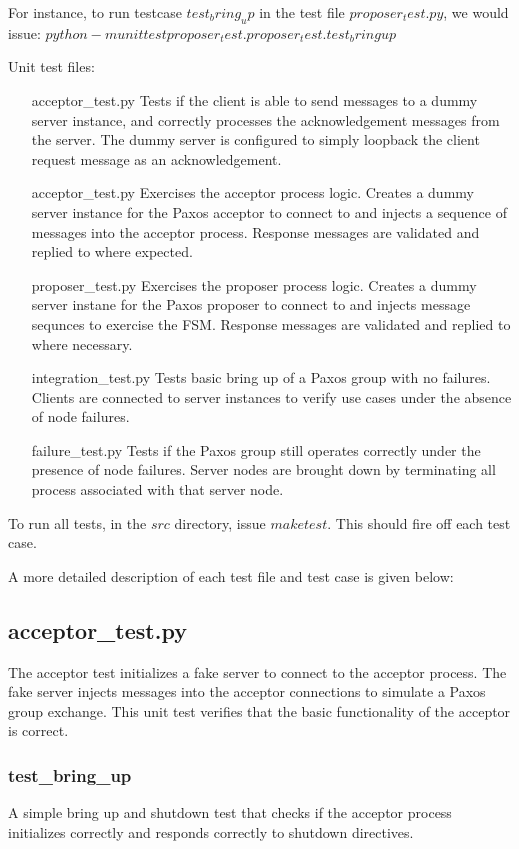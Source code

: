 \documentclass{article}
\begin{document}
For instance, to run testcase $test_bring_up$ in the test file $proposer_test.py$, we would issue:
$ python -m unittest proposer_test.proposer_test.test_bringup $

Unit test files:
\begin{itemize}
\item [acceptor\_test.py] Tests if the client is able to send messages to a dummy server instance, and correctly processes the acknowledgement messages from the server. 
  The dummy server is configured to simply loopback the client request message as an acknowledgement.
\item [acceptor\_test.py] Exercises the acceptor process logic. 
  Creates a dummy server instance for the Paxos acceptor to connect to and injects a sequence of messages into the acceptor process. 
  Response messages are validated and replied to where expected.
\item [proposer\_test.py] Exercises the proposer process logic.
  Creates a dummy server instane for the Paxos proposer to connect to and injects message sequnces to exercise the FSM.
  Response messages are validated and replied to where necessary.
\item [integration\_test.py] Tests basic bring up of a Paxos group with no failures.
  Clients are connected to server instances to verify use cases under the absence of node failures.
\item [failure\_test.py] Tests if the Paxos group still operates correctly under the presence of node failures.
  Server nodes are brought down by terminating all process associated with that server node.
\end{itemize}

To run all tests, in the $src$ directory, issue $make test$.
This should fire off each test case.

A more detailed description of each test file and test case is given below:

\subsection{acceptor\_test.py}

The acceptor test initializes a fake server to connect to the acceptor process.
The fake server injects messages into the acceptor connections to simulate a Paxos group exchange.
This unit test verifies that the basic functionality of the acceptor is correct.

\subsubsection{test\_bring\_up}
A simple bring up and shutdown test that checks if the acceptor process initializes correctly and responds correctly to shutdown directives.
\end{document}
